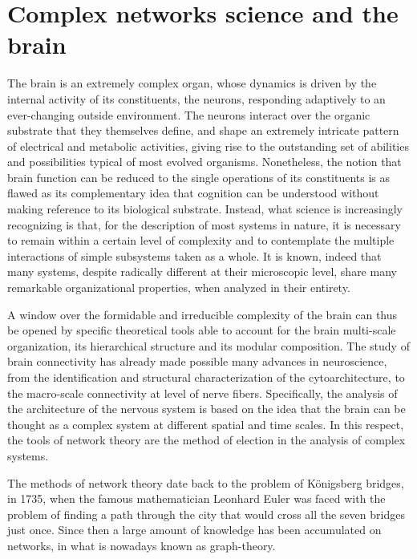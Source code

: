 \section{Complex networks science and the brain}\label{sec:complexnetworksciencebrain}
The brain is an extremely complex organ, whose dynamics is driven by the internal activity of its constituents, the neurons, responding adaptively to an ever-changing outside environment.
The neurons interact over the organic substrate that they themselves define, and shape an extremely intricate pattern of electrical and metabolic activities, giving rise to the outstanding set of abilities and possibilities typical of most evolved organisms.
Nonetheless, the notion that brain function can be reduced to the single operations of its constituents is as flawed as its complementary idea that cognition can be understood without making reference to its biological substrate.
Instead, what science is increasingly recognizing is that, for the description of most systems in nature, it is necessary to remain within a certain level of complexity and to contemplate the multiple interactions of simple subsystems taken as a whole.
It is known, indeed that many systems, despite radically different at their microscopic level, share many remarkable organizational properties, when analyzed in their entirety.

A window over the formidable and irreducible complexity of the brain can thus be opened by specific theoretical tools able to account for the brain multi-scale organization, its hierarchical structure and its modular composition.
The study of brain connectivity has already made possible many advances in neuroscience, from the identification and structural characterization of the cytoarchitecture, to the macro-scale connectivity at level of nerve fibers.
Specifically, the analysis of the architecture of the nervous system is based on the idea that the brain can be thought as a complex system at different spatial and time scales. In this respect, the tools of network theory are the method of election in the analysis of complex systems.

\bigbreak

The methods of network theory date back to the problem of K{\"o}nigsberg bridges, in 1735, when the famous mathematician Leonhard Euler was faced with the problem of finding a path through the city that would cross all the seven bridges just once.
Since then a large amount of knowledge has been accumulated on networks, in what is nowadays known as graph-theory.


